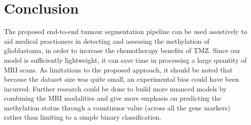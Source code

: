 \def\baselinestretch{1}
\chapter{Conclusion}
\ifpdf
    \graphicspath{{Conclusions/ConclusionsFigs/PNG/}{Conclusions/ConclusionsFigs/PDF/}{Conclusions/ConclusionsFigs/}}
\else
    \graphicspath{{Conclusions/ConclusionsFigs/EPS/}{Conclusions/ConclusionsFigs/}}
\fi

\def\baselinestretch{1.66}

The proposed end-to-end tumour segmentation pipeline can be used assistively to aid medical practioners in detecting and assessing the methylation of glioblastoma, in order to increase the chemotherapy benefits of TMZ. Since our model is sufficiently lightweight, it can save time in processing a large quantity of MRI scans. As limitations to the proposed approach, it should be noted that because the dataset size was quite small, an experimental bias could have been incurred. Further research could be done to build more nuanced models by combining the MRI modalities and give more emphasis on predicting the methylation status through a countinuos value (across all the gene markers) rather than limiting to a simple binary classification.




